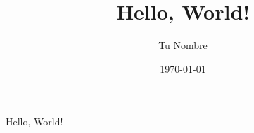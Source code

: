 \documentclass{article}
\begin{document}
\title{Hello, World!}
\author{Tu Nombre}
\date{\today}

\maketitle

Hello, World!
\end{document}
